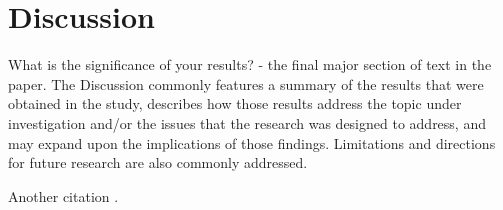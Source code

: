 \documentclass[12pt]{article}
\begin{document}
\section{Discussion}
What is the significance of your results? - the final major section of text in the paper.  The Discussion commonly features a summary of the results that were obtained in the study, describes how those results address the topic under investigation and/or the issues that the research was designed to address, and may expand upon the implications of those findings.  Limitations and directions for future research are also commonly addressed.

Another citation \citep{srinath2017python}.



\end{document}
